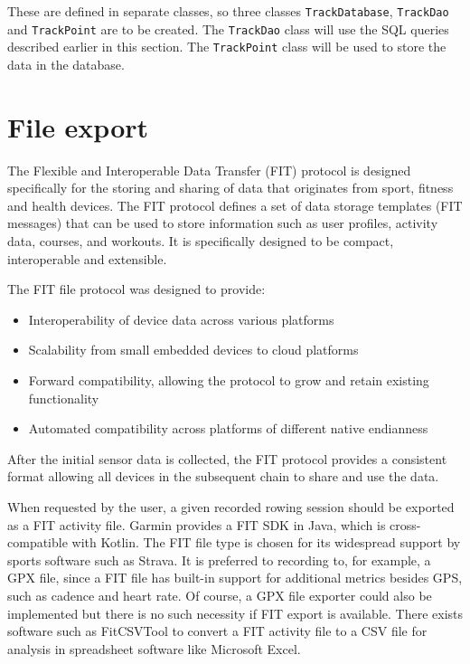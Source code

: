 \documentclass[11pt,twoside,a4paper]{report}
\begin{document}
These are defined in separate classes, so three classes \texttt{TrackDatabase}, \texttt{TrackDao} and \texttt{TrackPoint} are to be created. The \texttt{TrackDao} class will use the SQL queries described earlier in this section. The \texttt{TrackPoint} class will be used to store the data in the database.

\section{File export}

\begin{displayquote}
The Flexible and Interoperable Data Transfer (FIT) protocol is designed specifically for the storing and sharing of data that originates from sport, fitness and health devices. The FIT protocol defines a set of data storage templates (FIT messages) that can be used to store information such as user profiles, activity data, courses, and workouts. It is specifically designed to be compact, interoperable and extensible.

The FIT file protocol was designed to provide:
\begin{itemize}
  \item Interoperability of device data across various platforms
  \item Scalability from small embedded devices to cloud platforms
  \item Forward compatibility, allowing the protocol to grow and retain existing functionality
  \item Automated compatibility across platforms of different native endianness
\end{itemize}

After the initial sensor data is collected, the FIT protocol provides a consistent format allowing all devices in the subsequent chain to share and use the data.



\end{displayquote}

When requested by the user, a given recorded rowing session should be exported as a FIT activity file. Garmin provides a FIT SDK in Java, which is cross-compatible with Kotlin. The FIT file type is chosen for its widespread support by sports software such as Strava. It is preferred to recording to, for example, a GPX file, since a FIT file has built-in support for additional metrics besides GPS, such as cadence and heart rate. Of course, a GPX file exporter could also be implemented but there is no such necessity if FIT export is available. There exists software such as FitCSVTool to convert a FIT activity file to a CSV file for analysis in spreadsheet software like Microsoft Excel.
\end{document}
